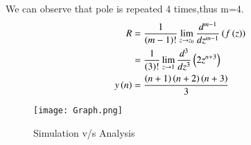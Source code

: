 \documentclass[journal,12pt,twocolumn]{IEEEtran}
\theoremstyle{remark}
\begin{document}
We can observe that pole is repeated 4 times,thus m=4.
\begin{align}
 R&=\frac{1}{\left(m-1\right)!}\lim\limits_{z\to z_{0}}\frac{d^{m-1}}{dz^{m-1}}\left(f\left(z\right)\right)\label{eq:11.9.4.1.11}\\
 &=\frac{1}{\left(3\right)!}\lim\limits_{z\to 1}\frac{d^{3}}{dz^{3}}\left(2z^{n+3}\right)\label{eq:11.9.4.1.12}\\
 y\left(n\right)&=\frac{\left(n+1\right)\left(n+2\right)\left(n+3\right)}{3}\label{eq:11.9.4.1.13}
\end{align}
\begin{figure}[h]
        \centering
\texttt{[image: Graph.png]}
    \caption{Simulation v/s Analysis}
    \label{fig:plot11.9.4.1}
\end{figure}
\end{document}

